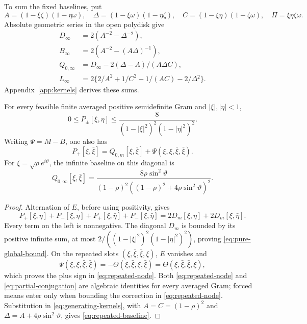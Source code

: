 To sum the fixed baselines, put
\[
 A=(1-\xi\zeta)(1-\eta\omega),\quad \Delta{}=(1-\xi\omega)(1-\eta\zeta),\quad
 C=(1-\xi\eta)(1-\zeta\omega),\quad \Pi=\xi\eta\zeta\omega.
\]
Absolute geometric series in the open polydisk give
\begin{equation}
\begin{aligned}
 D_\infty&=2(A^{-2}-\Delta{}^{-2}),\\
 B_\infty&=2(A^{-2}-(A\Delta{})^{-1}),\\
 Q_{0,\infty}&=D_\infty-2(\Delta{}-A)/(A\Delta{}C),\\
 L_\infty&=2\{2/A^2+1/C^2-1/(AC)-2/\Delta{}^2\}.
\end{aligned}                                                    \label{eq:generating-kernels}
\end{equation}
Appendix~\ref{app:kernels} derives these sums.

\begin{lemma}\label{lem:global} For every feasible
finite averaged positive semidefinite Gram and \(|\xi|,|\eta|<1\),
\begin{equation}
 0\le P_\pm[\xi,\eta]\le
                  \frac8{(1-|\xi|^2)^2(1-|\eta|^2)^2}.      \label{eq:pure-global-bound}
\end{equation}
Writing \(\Psi=M-B\), one also has
\begin{equation}
 P_+[\xi,\bar \xi]=Q_{0,m}[\xi,\bar \xi]
                         +\Psi(\xi,\xi,\bar \xi,\bar \xi).        \label{eq:repeated-node}
\end{equation}
For \(\xi=\sqrt\rho e^{i\vartheta}\), the infinite baseline on this diagonal is
\begin{equation}
 Q_{0,\infty}[\xi,\bar \xi]=
 \frac{8\rho\sin^2\vartheta}
 {(1-\rho)^2((1-\rho)^2+4\rho\sin^2\vartheta)^2}.           \label{eq:repeated-baseline}
\end{equation}

\end{lemma}
\begin{proof} Alternation of \(E\), before using positivity, gives
\begin{equation}
 P_+[\xi,\eta]+P_-[\xi,\eta]+P_+[\xi,\bar \eta]+P_-[\xi,\bar \eta]
                        =2D_m[\xi,\eta]+2D_m[\xi,\bar \eta].     \label{eq:partial-conjugation}
\end{equation}
Every term on the left is nonnegative. The diagonal \(D_m\) is bounded
by its positive infinite sum, at most
\(2/((1-|\xi|^2)^2(1-|\eta|^2)^2)\), proving \eqref{eq:pure-global-bound}.
On the repeated slots \((\xi,\bar \xi,\bar \xi,\xi)\), \(E\) vanishes and
\[
 \Psi(\xi,\xi,\bar \xi,\bar \xi)
     =-\Theta(\xi,\bar \xi,\xi,\bar \xi)=\Theta(\xi,\bar \xi,\bar \xi,\xi),
\]
which proves the plus sign in \eqref{eq:repeated-node}. Both \eqref{eq:repeated-node} and \eqref{eq:partial-conjugation} are algebraic
identities for every averaged Gram; forced means enter only when bounding
the correction in \eqref{eq:repeated-node}. Substitution in \eqref{eq:generating-kernels}, with
\(A=C=(1-\rho)^2\) and \(\Delta{}=A+4\rho\sin^2\vartheta\), gives \eqref{eq:repeated-baseline}. \end{proof}

